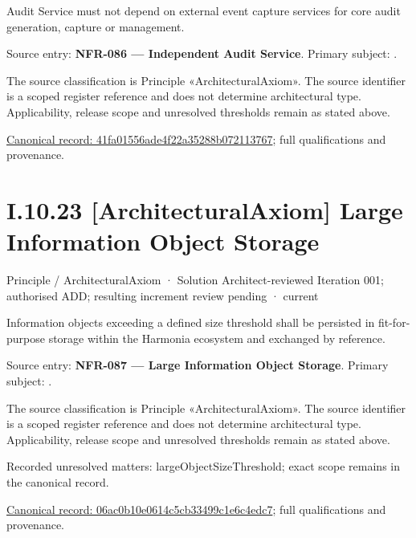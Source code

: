 Audit Service must not depend on external event capture services for core audit generation, capture or management.



Source entry: \textbf{NFR-086 — Independent Audit Service}. Primary subject: \texttt{}.



The source classification is Principle «ArchitecturalAxiom». The source identifier is a scoped register reference and does not determine architectural type. Applicability, release scope and unresolved thresholds remain as stated above.


{\footnotesize \href{../../../../../../../continuum/motivation/principle/architectural-axiom/41fa01556ade4f22a35288b072113767.md}{Canonical record: 41fa01556ade4f22a35288b072113767}; full qualifications and provenance.}\par
\section*{I.10.23 [ArchitecturalAxiom] Large Information Object Storage}
\label{navigation:I.10.23}

\label{element:06ac0b10e0614c5cb33499c1e6c4edc7}
{\small Principle / ArchitecturalAxiom · Solution Architect-reviewed Iteration 001; authorised ADD; resulting increment review pending · current}\par

Information objects exceeding a defined size threshold shall be persisted in fit-for-purpose storage within the Harmonia ecosystem and exchanged by reference.



Source entry: \textbf{NFR-087 — Large Information Object Storage}. Primary subject: \texttt{}.



The source classification is Principle «ArchitecturalAxiom». The source identifier is a scoped register reference and does not determine architectural type. Applicability, release scope and unresolved thresholds remain as stated above.


{\small Recorded unresolved matters: largeObjectSizeThreshold; exact scope remains in the canonical record.}\par
{\footnotesize \href{../../../../../../../continuum/motivation/principle/architectural-axiom/06ac0b10e0614c5cb33499c1e6c4edc7.md}{Canonical record: 06ac0b10e0614c5cb33499c1e6c4edc7}; full qualifications and provenance.}\par
